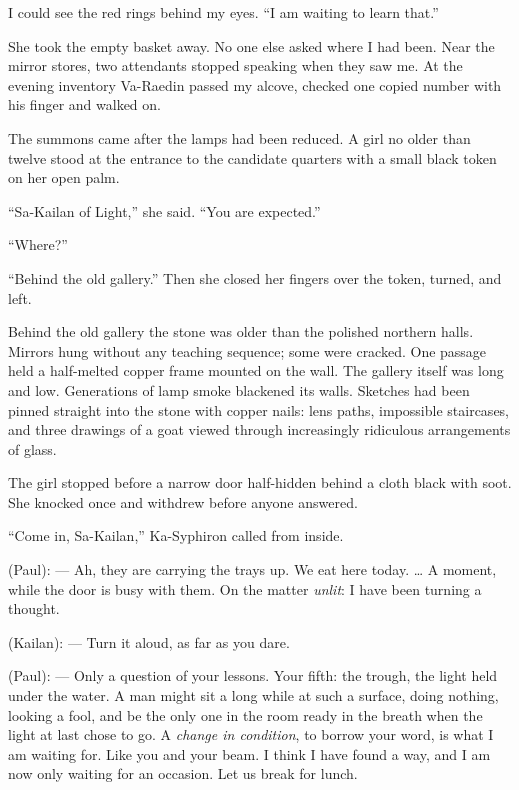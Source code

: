 I could see the red rings behind my eyes. ``I am waiting to learn that.''\par

She took the empty basket away. No one else asked where I had been. Near the mirror stores, two attendants stopped speaking when they saw me. At the evening inventory Va-Raedin passed my alcove, checked one copied number with his finger and walked on.\par

The summons came after the lamps had been reduced. A girl no older than twelve stood at the entrance to the candidate quarters with a small black token on her open palm.\par

``Sa-Kailan of Light,'' she said. ``You are expected.''\par
``Where?''\par
``Behind the old gallery.'' Then she closed her fingers over the token, turned, and left.\par

\ornament

Behind the old gallery the stone was older than the polished northern halls. Mirrors hung without any teaching sequence; some were cracked. One passage held a half-melted copper frame mounted on the wall. The gallery itself was long and low. Generations of lamp smoke blackened its walls. Sketches had been pinned straight into the stone with copper nails: lens paths, impossible staircases, and three drawings of a goat viewed through increasingly ridiculous arrangements of glass. \par

The girl stopped before a narrow door half-hidden behind a cloth black with soot. She knocked once and withdrew before anyone answered.\par

``Come in, Sa-Kailan,'' Ka-Syphiron called from inside.\par

\begin{room}

(Paul): --- Ah, they are carrying the trays up. We eat here today. \ldots{} A moment, while the door is busy with them. On the matter \textit{unlit}: I have been turning a thought.

(Kailan): --- Turn it aloud, as far as you dare.

(Paul): --- Only a question of your lessons. Your fifth: the trough, the light held under the water. A man might sit a long while at such a surface, doing nothing, looking a fool, and be the only one in the room ready in the breath when the light at last chose to go. A \textit{change in condition}, to borrow your word, is what I am waiting for. Like you and your beam. I think I have found a way, and I am now only waiting for an occasion. Let us break for lunch.

\end{room}

